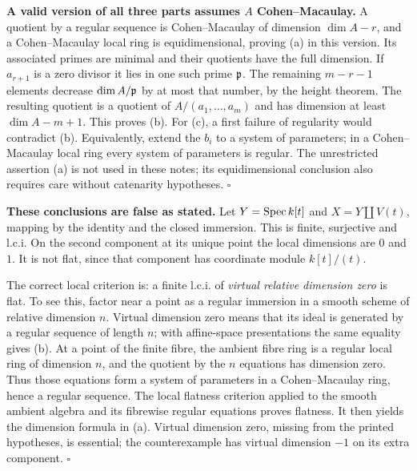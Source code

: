 \documentclass[11pt]{article}
\let\chapterexercise\exercise
\renewcommand{\exercise}[2]{\Needspace{8\baselineskip}\chapterexercise{#1}{#2}}
\begin{document}
\textbf{A valid version of all three parts assumes $A$ Cohen--Macaulay.} A quotient by a regular sequence is Cohen--Macaulay of dimension $\dim A-r$, and a Cohen--Macaulay local ring is equidimensional, proving (a) in this version. Its associated primes are minimal and their quotients have the full dimension. If $a_{r+1}$ is a zero divisor it lies in one such prime $\mathfrak p$. The remaining $m-r-1$ elements decrease $\dim A/\mathfrak p$ by at most that number, by the height theorem. The resulting quotient is a quotient of $A/(a_1,\ldots,a_m)$ and has dimension at least $\dim A-m+1$. This proves (b). For (c), a first failure of regularity would contradict (b). Equivalently, extend the $b_i$ to a system of parameters; in a Cohen--Macaulay local ring every system of parameters is regular. The unrestricted assertion (a) is not used in these notes; its equidimensional conclusion also requires care without catenarity hypotheses. \hfill$\square$

\pf
\textbf{These conclusions are false as stated.} Let $Y=\operatorname{Spec} k[t]$ and $X=Y\amalg V(t)$, mapping by the identity and the closed immersion. This is finite, surjective and l.c.i. On the second component at its unique point the local dimensions are $0$ and $1$. It is not flat, since that component has coordinate module $k[t]/(t)$.

The correct local criterion is: a finite l.c.i. of \emph{virtual relative dimension zero} is flat. To see this, factor near a point as a regular immersion in a smooth scheme of relative dimension $n$. Virtual dimension zero means that its ideal is generated by a regular sequence of length $n$; with affine-space presentations the same equality gives (b). At a point of the finite fibre, the ambient fibre ring is a regular local ring of dimension $n$, and the quotient by the $n$ equations has dimension zero. Thus those equations form a system of parameters in a Cohen--Macaulay ring, hence a regular sequence. The local flatness criterion applied to the smooth ambient algebra and its fibrewise regular equations proves flatness. It then yields the dimension formula in (a). Virtual dimension zero, missing from the printed hypotheses, is essential; the counterexample has virtual dimension $-1$ on its extra component. \hfill$\square$
\end{document}
